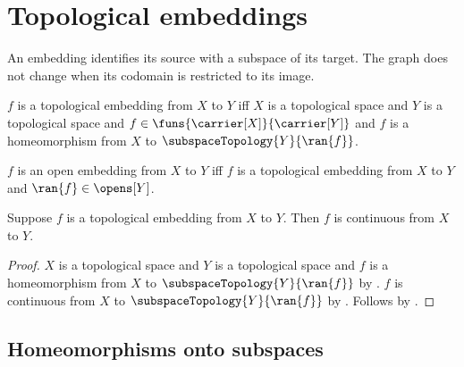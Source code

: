 \section{Topological embeddings}





An embedding identifies its source with a subspace of its target. The graph
does not change when its codomain is restricted to its image.

\begin{definition}\label{topological_embedding}
    $f$ is a topological embedding from $X$ to $Y$ iff
        $X$ is a topological space and $Y$ is a topological space and
        $f\in\funs{\carrier[X]}{\carrier[Y]}$ and
        $f$ is a homeomorphism from $X$ to
            $\subspaceTopology{Y}{\ran{f}}$.
\end{definition}

\begin{definition}\label{open_embedding}
    $f$ is an open embedding from $X$ to $Y$ iff
        $f$ is a topological embedding from $X$ to $Y$ and
        $\ran{f}\in\opens[Y]$.
\end{definition}

\begin{proposition}\label{topological_embedding_continuous}
    Suppose $f$ is a topological embedding from $X$ to $Y$.
    Then $f$ is continuous from $X$ to $Y$.
\end{proposition}
\begin{proof}
    $X$ is a topological space and $Y$ is a topological space and
        $f$ is a homeomorphism from $X$ to
            $\subspaceTopology{Y}{\ran{f}}$ by
        .
    $f$ is continuous from $X$ to $\subspaceTopology{Y}{\ran{f}}$
        by .
    Follows by .
\end{proof}

\subsection{Homeomorphisms onto subspaces}

